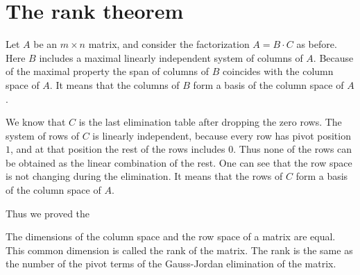 \section{The rank theorem}
\begin{frame}
Let $A$ be an $m\times n$ matrix, and consider the factorization $A=B\cdot C$ as before.
Here $B$ includes a maximal linearly independent system of columns of $A$. 
Because of the maximal property the span of columns of $B$ coincides with the column space of $A$.
It means that the columns of $B$ form a basis of the column space of $A$.

We know that $C$ is the last elimination table after dropping the zero rows.
The system of rows of $C$ is linearly independent, because every row has pivot position $1$,
and at that position the rest of the rows includes $0$. 
Thus none of the rows can be obtained as the linear combination of the rest.
One can see that the row space is not changing during the elimination.
It means that the rows of $C$ form a basis of the column space of $A$.

Thus we proved the 
    \begin{theorem}
        The dimensions of the column space and the row space of a matrix are equal.
        This common dimension is called the \alert{rank of the matrix}.
        The rank is the same as the number of the pivot terms of the Gauss-Jordan elimination of the matrix.
    \end{theorem}
\end{frame}

